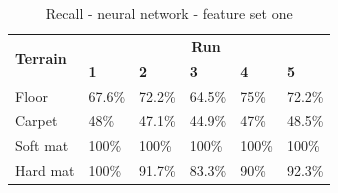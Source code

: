 \documentclass[USenglish]{ifimaster}  %
\begin{document}
\hfill
\begin{table}[h]\ContinuedFloat
	\begin{subtable}[h]{1\textwidth}
		\centering
		\captionsetup{justification=centering}
		\begin{tabular}{@{}llllll@{}}
			\toprule
			\multirow{2}{*}{\textbf{Terrain}} & \multicolumn{5}{c}{\textbf{Run}} \\ \cmidrule(l){2-6} 
			& \multicolumn{1}{l|}{\textbf{1}} & \multicolumn{1}{l|}{\textbf{2}} & \multicolumn{1}{l|}{\textbf{3}} & \multicolumn{1}{l|}{\textbf{4}} & \textbf{5} \\ \midrule
			\multicolumn{1}{l|}{Floor} & \multicolumn{1}{l|}{67.6\%} & \multicolumn{1}{l|}{72.2\%} & \multicolumn{1}{l|}{64.5\%} & \multicolumn{1}{l|}{75\%} & 72.2\% \\ \midrule
			\multicolumn{1}{l|}{Carpet} & \multicolumn{1}{l|}{48\%} & \multicolumn{1}{l|}{47.1\%} & \multicolumn{1}{l|}{44.9\%} & \multicolumn{1}{l|}{47\%} & 48.5\% \\ \midrule
			\multicolumn{1}{l|}{Soft mat} & \multicolumn{1}{l|}{100\%} & \multicolumn{1}{l|}{100\%} & \multicolumn{1}{l|}{100\%} & \multicolumn{1}{l|}{100\%} & 100\% \\ \midrule
			\multicolumn{1}{l|}{Hard mat} & \multicolumn{1}{l|}{100\%} & \multicolumn{1}{l|}{91.7\%} & \multicolumn{1}{l|}{83.3\%} & \multicolumn{1}{l|}{90\%} & 92.3\% \\ \bottomrule
		\end{tabular}
		\caption{Recall - neural network - feature set one}
		\label{nnrecall}
	\end{subtable}
\end{table}
\end{document}
